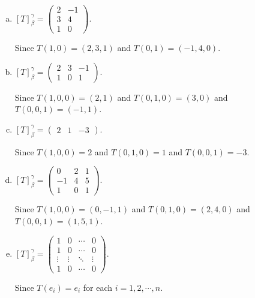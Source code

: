 \begin{Exercise}
	\begin{enumerate}[(a)]
		\item
		\begin{answer}
			$[T]_{\beta}^{\gamma} = \begin{pmatrix}
			2 & -1 \\
			3 & 4 \\
			1 & 0
			\end{pmatrix}$.
		\end{answer}
		\begin{solution}
			Since $T(1,0) = (2,3,1)$ and $T(0,1) = (-1,4,0)$.
		\end{solution}
		
		\item
		\begin{answer}
			$[T]_{\beta}^{\gamma} = \begin{pmatrix}
			2 & 3 & -1 \\
			1 & 0 & 1
			\end{pmatrix}$.
		\end{answer}
		\begin{solution}
			Since $T(1,0,0) = (2,1)$ and $T(0,1,0) = (3,0)$ and $T(0,0,1) = (-1,1)$.
		\end{solution}
		
		\item
		\begin{answer}
			$[T]_{\beta}^{\gamma} = \begin{pmatrix}
			2 & 1 & -3
			\end{pmatrix}$.
		\end{answer}
		\begin{solution}
			Since $T(1,0,0) = 2$ and $T(0,1,0) = 1$ and $T(0,0,1) = -3$.
		\end{solution}
		
		\item
		\begin{answer}
			$[T]_{\beta}^{\gamma} = \begin{pmatrix}
			0 & 2 & 1 \\
			-1 & 4 & 5 \\
			1 & 0 & 1
			\end{pmatrix}$.
		\end{answer}
		\begin{solution}
			Since $T(1,0,0) = (0,-1,1)$ and $T(0,1,0) = (2,4,0)$ and $T(0,0,1) = (1,5,1)$.
		\end{solution}
		
		\item
		\begin{answer}
			$[T]_{\beta}^{\gamma} = \begin{pmatrix}
			1 & 0 & \cdots & 0 \\
			1 & 0 & \cdots & 0 \\
			\vdots & \vdots & \ddots & \vdots \\
			1 & 0 & \cdots & 0
			\end{pmatrix}$.
		\end{answer}
		\begin{solution}
			Since $T(e_i) = e_i$ for each $i=1,2,\cdots, n$.
		\end{solution}
		

\end{enumerate}
\end{Exercise}
